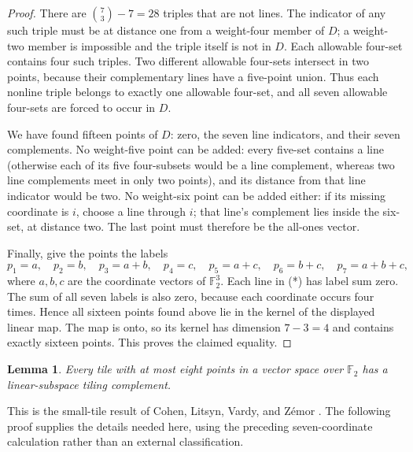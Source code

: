 \documentclass[11pt]{article}
\numberwithin{equation}{section}
\newtheorem{lemma}[theorem]{Lemma}
\theoremstyle{definition}
\theoremstyle{remark}\newtheorem{remark}[theorem]{Remark}
\newcommand{\F}{\mathbb F_2}
\begin{document}
\begin{proof}
There are $\binom73-7=28$ triples that are not lines.  The indicator of
any such triple must be at distance one from a weight-four member of $D$;
a weight-two member is impossible and the triple itself is not in $D$.
Each allowable four-set contains four such triples.  Two different
allowable four-sets intersect in two points, because their complementary
lines have a five-point union.  Thus each nonline triple belongs to
exactly one allowable four-set, and all seven allowable four-sets are
forced to occur in $D$.

We have found fifteen points of $D$: zero, the seven line indicators,
and their seven complements.  No weight-five point can be added: every
five-set contains a line (otherwise each of its five four-subsets would
be a line complement, whereas two line complements meet in only two
points), and its distance from that line indicator would be two.
No weight-six point can be added either: if its missing coordinate is
$i$, choose a line through $i$; that line's complement lies inside the
six-set, at distance two.  The last point must therefore be the all-ones
vector.

Finally, give the points the labels
\[
 p_1=a,\quad p_2=b,\quad p_3=a+b,\quad p_4=c,\quad
 p_5=a+c,\quad p_6=b+c,\quad p_7=a+b+c,
\]
where $a,b,c$ are the coordinate vectors of $\mathbb F_2^3$.
Each line in (*) has label sum zero.  The sum of all seven labels is
also zero, because each coordinate occurs four times.  Hence all sixteen
points found above lie in the kernel of the displayed linear map.
The map is onto, so its kernel has dimension $7-3=4$ and contains exactly
sixteen points.  This proves the claimed equality.
\end{proof}

\begin{lemma}\label{lem:small-tile-elementary}
Every tile with at most eight points in a vector space over $\F$ has a
linear-subspace tiling complement.
\end{lemma}

This is the small-tile result of Cohen, Litsyn, Vardy, and Z\'emor
\cite{CLVZ}.  The following proof supplies the details needed here,
using the preceding seven-coordinate calculation rather than an external
classification.
\end{document}
